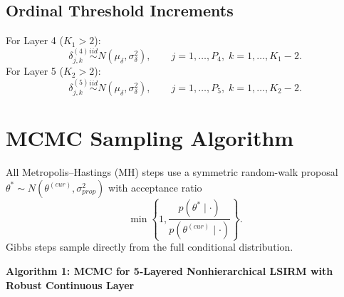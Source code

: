 \documentclass[11pt]{article}
\begin{document}
\subsection{Ordinal Threshold Increments}
For Layer 4 ($K_1>2$):
\[
\delta_{j,k}^{(4)} \overset{iid}{\sim} N(\mu_\delta,\sigma_\delta^2),
\qquad j=1,\dots,P_4,\; k=1,\dots,K_1-2.
\]
For Layer 5 ($K_2>2$):
\[
\delta_{j,k}^{(5)} \overset{iid}{\sim} N(\mu_\delta,\sigma_\delta^2),
\qquad j=1,\dots,P_5,\; k=1,\dots,K_2-2.
\]

\section{MCMC Sampling Algorithm}

All Metropolis--Hastings (MH) steps use a symmetric random-walk proposal $\theta^*\sim N(\theta^{(cur)},\sigma_{prop}^2)$ with acceptance ratio
\[
\min\left\{1,\frac{p(\theta^*\mid \cdot)}{p(\theta^{(cur)}\mid \cdot)}\right\}.
\]
Gibbs steps sample directly from the full conditional distribution.

\bigskip
\noindent
\textbf{Algorithm 1: MCMC for 5-Layered Nonhierarchical LSIRM with Robust Continuous Layer}
\end{document}
